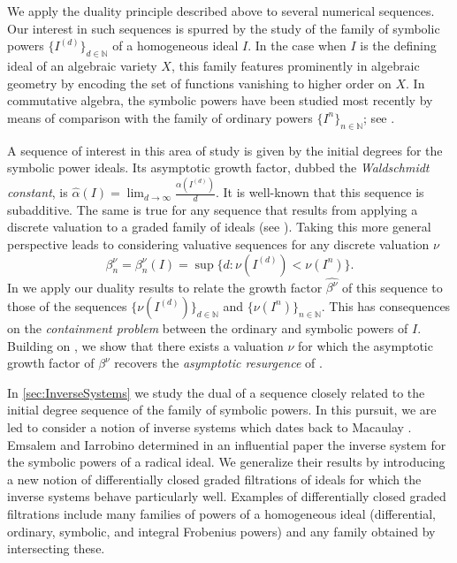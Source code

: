 \documentclass[12pt, reqno]{amsart}
\numberwithin{equation}{section}
\def\b{\ensuremath{\beta}}
\newcommand{\wa}{\widehat{\alpha}}
\newcommand{\wrho}{\widehat{\rho}}
\newcommand{\N}{{\mathbb N}}
\newcommand{\Z}{{\mathbb Z}}
\theoremstyle{plain} %
\newtheorem*{introthm*}{Theorem}
\theoremstyle{definition}
\theoremstyle{remark}
\begin{document}
We apply the duality principle described above to several numerical sequences. Our interest in such sequences is spurred by the study of the family of symbolic powers $\{I^{(d)}\}_{d\in\N}$ of a homogeneous ideal $I$. In the case when $I$ is the defining ideal of an algebraic variety $X$, this family features prominently in algebraic geometry by encoding the set of functions vanishing to higher order on $X$. In commutative algebra, the symbolic powers have been studied most recently by means of comparison with the family of ordinary powers $\{I^n\}_{n\in\N}$; see \cite{ELS, HoHu, MaSchwede, BH10}.

A sequence of interest in this area of study is given by the initial degrees for the symbolic power ideals. Its asymptotic growth factor, dubbed the {\em Waldschmidt constant}, is $\wa(I)=\lim_{d\to \infty}\frac{\alpha(I^{(d)})}{d}$. It is well-known that this sequence is subadditive.  The same is true for any sequence that results from applying a discrete valuation to a graded family of ideals (see ). Taking this more general perspective leads to considering valuative sequences for any discrete valuation  $\nu$
\[
\beta^{\nu}_n=\beta^{\nu}_n(I)=\sup\{d:\nu(I^{(d)}) < \nu(I^n)\}.
\]
In  we apply our duality results to relate the growth factor $\widehat{\beta^{\nu}}$ of this sequence to those of the sequences $\{\nu(I^{(d)})\}_{d\in\N}$ and $\{\nu(I^n)\}_{n\in\N}$. 
This has consequences on  the {\em containment problem} between the ordinary and symbolic powers of $I$.  Building on \cite{DFMS, DD21}, we show that there exists a valuation $\nu$ for which the asymptotic growth factor of $\beta^{\nu}$ recovers the {\em asymptotic resurgence} of \cite{GHV13}.
%

In \cref{sec:InverseSystems} we study the dual of a sequence closely related to the initial degree sequence of the family of symbolic powers. In this pursuit, we are led to consider a notion of inverse systems which dates back to Macaulay \cite{Macaulay}. Emsalem and Iarrobino determined in an influential paper \cite{EI95} the inverse system for the symbolic powers of a radical ideal. We generalize their results by introducing a new notion of differentially closed graded filtrations of ideals for which the inverse systems behave particularly well.  Examples of differentially closed graded filtrations include many families of powers of a homogeneous ideal (differential, ordinary, symbolic, and integral Frobenius powers) and any family obtained by intersecting these.
\end{document}
